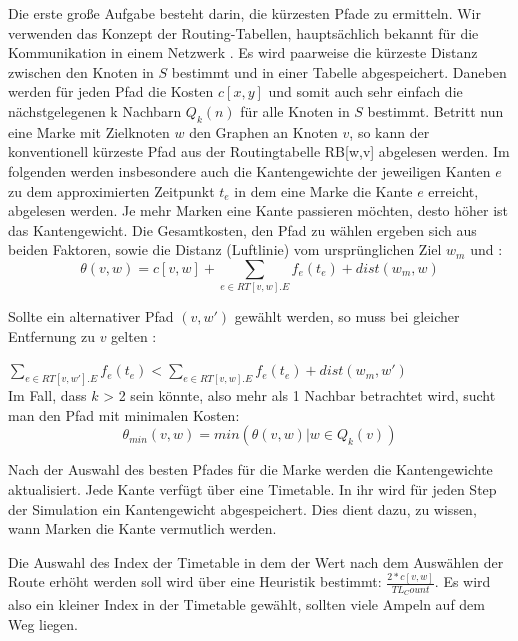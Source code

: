 \documentclass[paper=A4,pagesize=auto,12pt,headinclude=true,footinclude=true,BCOR=0mm,DIV=calc]{scrartcl}
\begin{document}
	Die erste große Aufgabe besteht darin, die kürzesten Pfade zu ermitteln. Wir verwenden das Konzept der Routing-Tabellen, hauptsächlich bekannt für die Kommunikation in einem Netzwerk \cite{RoutingTabelleNetzwerk}. Es wird paarweise die kürzeste Distanz zwischen den Knoten in $S$ bestimmt und in einer Tabelle abgespeichert. Daneben werden für jeden Pfad die Kosten $c[x,y]$ und somit auch sehr einfach die nächstgelegenen k Nachbarn $Q_{k}(n)$ für alle Knoten in $S$ bestimmt.
	Betritt nun eine Marke mit Zielknoten $w$ den Graphen an Knoten $v$, so kann der konventionell kürzeste Pfad aus der Routingtabelle RB[w,v] abgelesen werden. Im folgenden werden insbesondere auch die Kantengewichte der jeweiligen Kanten $e$ zu dem approximierten Zeitpunkt $t_{e}$ in dem eine Marke die Kante $e$ erreicht, abgelesen werden. Je mehr Marken eine Kante passieren möchten, desto höher ist das Kantengewicht. Die Gesamtkosten, den Pfad zu wählen ergeben sich aus beiden Faktoren, sowie die Distanz (Luftlinie) vom ursprünglichen Ziel $w_{m}$ und :\\
	
	\begin{equation}
	\theta(v,w)  = c[v,w] + \sum_{e \in RT[v,w].E} f_{e}(t_{e}) + dist(w_{m}, w)
	\end{equation}

	Sollte ein alternativer Pfad $(v,w')$ gewählt werden, so muss bei gleicher Entfernung zu $v$ gelten :
	
	 $\sum_{e \in RT[v,w'].E} f_{e}(t_{e}) < \sum_{e \in RT[v,w].E} f_{e}(t_{e}) + dist(w_{m}, w')$\\
	 
	Im Fall, dass $k$ > 2 sein könnte, also mehr als 1 Nachbar betrachtet wird, sucht man den Pfad mit minimalen Kosten:\\
	
	\begin{equation} 
	\theta_{min}(v,w) = min(\theta(v,w) | w \in Q_{k}(v))
	\end{equation}

	Nach der Auswahl des besten Pfades für die Marke werden die Kantengewichte aktualisiert. Jede Kante verfügt über eine Timetable. In ihr wird für jeden Step der Simulation ein Kantengewicht abgespeichert. Dies dient dazu, zu wissen, wann Marken die Kante vermutlich werden. 
	
	Die Auswahl des Index der Timetable in dem der Wert nach dem Auswählen der Route erhöht werden soll wird über eine Heuristik bestimmt: $\frac{2* c[v,w]}{TL_Count}$. Es wird also ein kleiner Index in der Timetable gewählt, sollten viele Ampeln auf dem Weg liegen.
	
\end{document}
